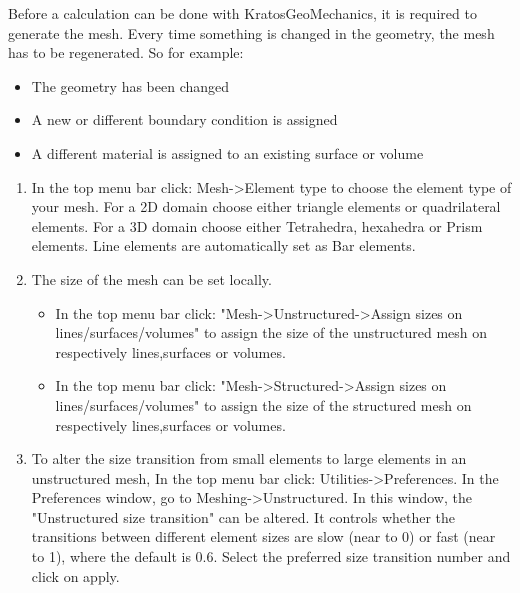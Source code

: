 
Before a calculation can be done with KratosGeoMechanics, it is required to generate the mesh. Every time something is changed in the geometry, the mesh has to be regenerated. So for example:

\begin{itemize}
	\setlength\itemsep{2mm}
	\item The geometry has been changed
	\item A new or different boundary condition is assigned
	\item A different material is assigned to an existing surface or volume
\end{itemize}

\begin{enumerate}
	\setlength\itemsep{2mm}
	\item In the top menu bar click: Mesh->Element type to choose the element type of your mesh. For a 2D domain choose either triangle elements or quadrilateral elements. For a 3D domain choose either Tetrahedra, hexahedra or Prism elements. Line elements are automatically set as Bar elements.
	\item The size of the mesh can be set locally.
\begin{itemize}	
	\setlength\itemsep{2mm}
	\item In the top menu bar click: "Mesh->Unstructured->Assign sizes on lines/surfaces/volumes" to assign the size of the unstructured mesh on respectively lines,surfaces or volumes. 
	\item In the top menu bar click: "Mesh->Structured->Assign sizes on lines/surfaces/volumes" to assign the size of the structured mesh on respectively lines,surfaces or volumes. 		
\end{itemize}
	\item To alter the size transition from small elements to large elements in an unstructured mesh, In the top menu bar click: Utilities->Preferences. In the Preferences window, go to Meshing->Unstructured. In this window, the "Unstructured size transition" can be altered. It controls whether the transitions between different element sizes are slow (near to 0) or fast (near to 1), where the default is 0.6. Select the preferred size transition number and click on apply. 
	 
\end{enumerate}
